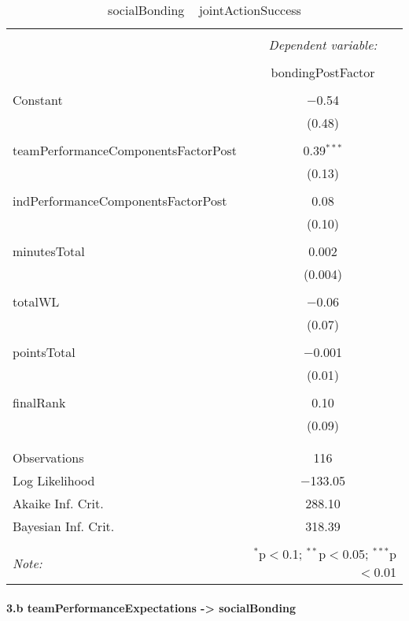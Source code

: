 \documentclass[12pt]{report}
\begin{document}
\begin{table}[!htbp] \centering
  \caption{socialBonding ~ jointActionSuccess}
  \label{}
\begin{tabular}{@{\extracolsep{5pt}}lc}
\\[-1.8ex]\hline
\hline \\[-1.8ex]
 & \multicolumn{1}{c}{\textit{Dependent variable:}} \\
\cline{2-2}
\\[-1.8ex] & bondingPostFactor \\
\hline \\[-1.8ex]
 Constant & $-$0.54 \\
  & (0.48) \\
  & \\
 teamPerformanceComponentsFactorPost & 0.39$^{***}$ \\
  & (0.13) \\
  & \\
 indPerformanceComponentsFactorPost & 0.08 \\
  & (0.10) \\
  & \\
 minutesTotal & 0.002 \\
  & (0.004) \\
  & \\
 totalWL & $-$0.06 \\
  & (0.07) \\
  & \\
 pointsTotal & $-$0.001 \\
  & (0.01) \\
  & \\
 finalRank & 0.10 \\
  & (0.09) \\
  & \\
\hline \\[-1.8ex]
Observations & 116 \\
Log Likelihood & $-$133.05 \\
Akaike Inf. Crit. & 288.10 \\
Bayesian Inf. Crit. & 318.39 \\
\hline
\hline \\[-1.8ex]
\textit{Note:}  & \multicolumn{1}{r}{$^{*}$p$<$0.1; $^{**}$p$<$0.05; $^{***}$p$<$0.01} \\
\end{tabular}
\end{table}


\paragraph{3.b teamPerformanceExpectations -> socialBonding} %
\end{document}
